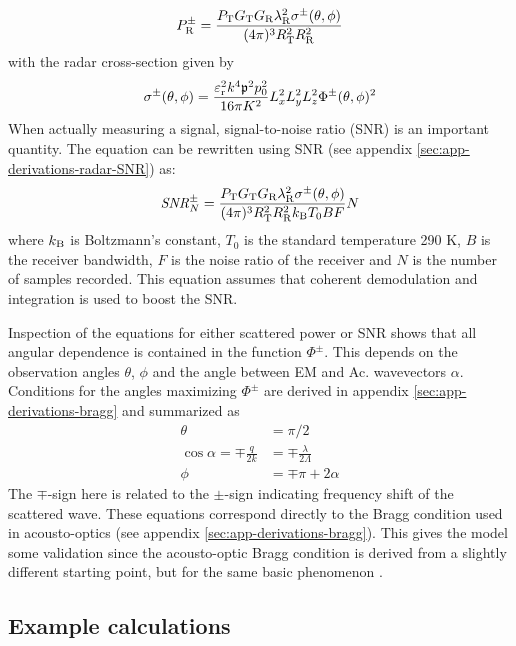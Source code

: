 \documentclass[11pt,twoside]{eitExjobb}
\begin{document}
	\begin{equation*}
		P_{\mathrm{R}}^\pm = \frac{P_{\mathrm{T}} G_{\mathrm{T}} G_{\mathrm{R}} \lambda_{\mathrm{R}}^2 \sigma^\pm (\theta,\phi)}{(4\pi)^3 R_{\mathrm{T}}^2 R_{\mathrm{R}}^2}
	\end{equation*}
	with the radar cross-section given by
	\begin{equation*}
		\sigma^\pm (\theta, \phi) = \frac{\varepsilon_{\mathrm{r}}^2 k^4 \mathfrak{p}^2 p_0^2}{16\pi K^2} L_{x}^2 L_{y}^2 L_{z}^2 \Phi^\pm (\theta,\phi)^2
	\end{equation*}
	When actually measuring a signal, signal-to-noise ratio (SNR) is an important quantity. The equation can be rewritten using SNR (see appendix \ref{sec:app-derivations-radar-SNR}) as:
	\begin{equation*}
		\mathit{SNR}^\pm_N = \frac{P_{\mathrm{T}} G_{\mathrm{T}} G_{\mathrm{R}} \lambda_{\mathrm{R}}^2 \sigma^\pm (\theta,\phi)}{(4\pi)^3 R_{\mathrm{T}}^2 R_{\mathrm{R}}^2 k_{\mathrm{B}} T_0 B F} N
	\end{equation*}
	where $k_{\mathrm{B}}$ is Boltzmann's constant, $T_0$ is the standard temperature 290 K, $B$ is the receiver bandwidth, $F$ is the noise ratio of the receiver and $N$ is the number of samples recorded. This equation assumes that coherent demodulation and integration is used to boost the SNR.
	
	Inspection of the equations for either scattered power or SNR shows that all angular dependence is contained in the function $\Phi^\pm$. This depends on the observation angles $\theta$, $\phi$ and the angle between EM and Ac. wavevectors $\alpha$. Conditions for the angles maximizing $\Phi^\pm$ are derived in appendix \ref{sec:app-derivations-bragg} and summarized as
	\begin{align}
		\theta &= \pi/2 \label{eq:an-bragg-theta} \\
		\cos{\alpha} = \mp \frac{q}{2k} &= \mp \frac{\lambda}{2\Lambda} \label{eq:an-bragg-alpha} \\
		\phi &= \mp \pi + 2\alpha \label{eq:an-bragg-phi}
	\end{align}
	The $\mp$-sign here is related to the $\pm$-sign indicating frequency shift of the scattered wave. These equations correspond directly to the Bragg condition used in acousto-optics (see appendix \ref{sec:app-derivations-bragg}). This gives the model some validation since the acousto-optic Bragg condition is derived from a slightly different starting point, but for the same basic phenomenon \cite{Saleh2007}.
	
	\subsection{Example calculations}
	
\end{document}
